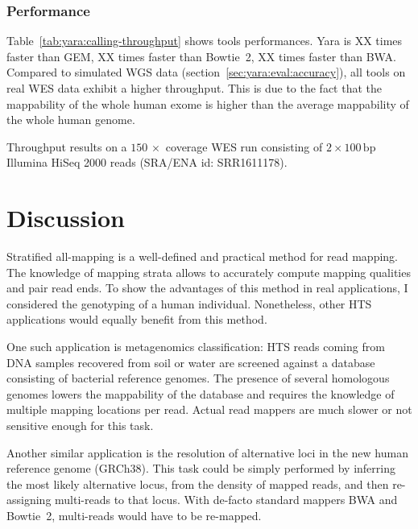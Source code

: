 \subsubsection{Performance}

Table~\ref{tab:yara:calling-throughput} shows tools performances.
Yara is XX times faster than GEM, XX times faster than Bowtie~2, XX times faster than BWA.
Compared to simulated WGS data (section~\ref{sec:yara:eval:accuracy}), all tools on real WES data exhibit a higher throughput. This is due to the fact that the mappability of the whole human exome is higher than the average mappability of the whole human genome.

\begin{table}[b]
\begin{center}
\caption[Yara throughput results on SRR1611178]{Throughput results on a $150\, \times$ coverage WES run consisting of $2 \times 100\,\text{bp}$ Illumina HiSeq 2000 reads (SRA/ENA id: SRR1611178).}
\sffamily

\label{tab:yara:calling-throughput}
\end{center}
\end{table}



\section{Discussion}

Stratified all-mapping is a well-defined and practical method for read mapping.
The knowledge of mapping strata allows to accurately compute mapping qualities and pair read ends.
To show the advantages of this method in real applications, I considered the genotyping of a human individual.
Nonetheless, other HTS applications would equally benefit from this method.

One such application is metagenomics classification:
HTS reads coming from DNA samples recovered from \eg soil or water are screened against a database consisting of bacterial reference genomes.
The presence of several homologous genomes lowers the mappability of the database and requires the knowledge of multiple mapping locations per read.
Actual read mappers are much slower or not sensitive enough for this task.

Another similar application is the resolution of alternative loci in the new human reference genome (GRCh38).
This task could be simply performed by inferring the most likely alternative locus, \eg from the density of mapped reads, and then re-assigning multi-reads to that locus.
With de-facto standard mappers BWA and Bowtie~2, multi-reads would have to be re-mapped.

